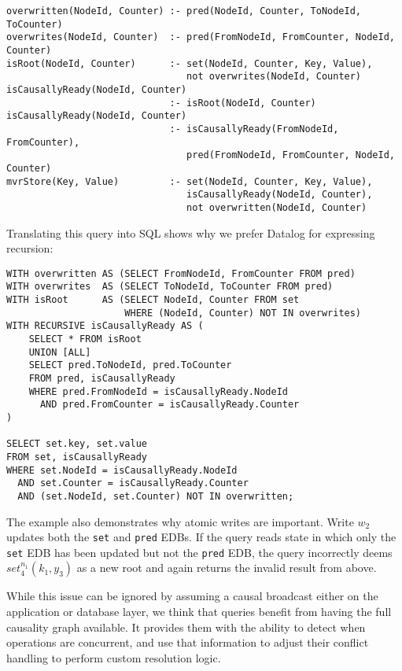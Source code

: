 \documentclass{article}
\newcommand{\code}[1]{\texttt{#1}}
\newcommand{\setop}[5][set]{$\mathit{#1}_{#2}^{#3}(#4, #5)$}
\begin{document}
\begin{small}
	\begin{verbatim}
overwritten(NodeId, Counter) :- pred(NodeId, Counter, ToNodeId, ToCounter)
overwrites(NodeId, Counter)  :- pred(FromNodeId, FromCounter, NodeId, Counter)
isRoot(NodeId, Counter)      :- set(NodeId, Counter, Key, Value),
                                not overwrites(NodeId, Counter)
isCausallyReady(NodeId, Counter)
                             :- isRoot(NodeId, Counter)
isCausallyReady(NodeId, Counter)
                             :- isCausallyReady(FromNodeId, FromCounter),
                                pred(FromNodeId, FromCounter, NodeId, Counter)
mvrStore(Key, Value)         :- set(NodeId, Counter, Key, Value),
                                isCausallyReady(NodeId, Counter),
                                not overwritten(NodeId, Counter)
\end{verbatim}
\end{small}

Translating this query into SQL shows why we prefer Datalog
for expressing recursion:

\begin{small}
	\begin{verbatim}
WITH overwritten AS (SELECT FromNodeId, FromCounter FROM pred)
WITH overwrites  AS (SELECT ToNodeId, ToCounter FROM pred)
WITH isRoot      AS (SELECT NodeId, Counter FROM set
                     WHERE (NodeId, Counter) NOT IN overwrites)
WITH RECURSIVE isCausallyReady AS (
    SELECT * FROM isRoot
    UNION [ALL]
    SELECT pred.ToNodeId, pred.ToCounter
    FROM pred, isCausallyReady
    WHERE pred.FromNodeId = isCausallyReady.NodeId
      AND pred.FromCounter = isCausallyReady.Counter
)

SELECT set.key, set.value
FROM set, isCausallyReady
WHERE set.NodeId = isCausallyReady.NodeId
  AND set.Counter = isCausallyReady.Counter
  AND (set.NodeId, set.Counter) NOT IN overwritten;
\end{verbatim}
\end{small}

The example also demonstrates why atomic writes are important.
Write \(w_2\) updates both the \code{set} and \code{pred} EDBs.
If the query reads state in which only the \code{set} EDB has been updated
but not the \code{pred} EDB,
the query incorrectly deems \setop{4}{n_1}{k_1}{y_3} as a new root and
again returns the invalid result from above.

While this issue can be ignored by assuming a causal broadcast either on the
application or database layer,
we think that queries benefit from having the full causality graph available.
It provides them with the ability to detect when operations are concurrent,
and use that information to adjust their conflict handling
to perform custom resolution logic.
\end{document}
